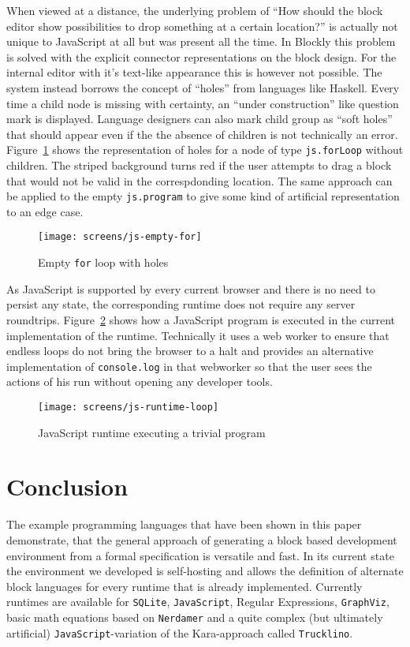 \documentclass[sigconf,natbib=false,review=true,anonymous]{acmart}
\begin{document}
When viewed at a distance, the underlying problem of \enquote{How should the block editor show possibilities to drop something at a certain location?} is actually not unique to JavaScript at all but was present all the time. In Blockly this problem is solved with the explicit connector representations on the block design. For the internal editor with it's text-like appearance this is however not possible. The system instead borrows the concept of \enquote{holes} from languages like Haskell. Every time a child node is missing with certainty, an \enquote{under construction} like question mark is displayed. Language designers can also mark child group as \enquote{soft holes} that should appear even if the the absence of children is not technically an error. Figure~\ref{fig:screen-js-empty-for} shows the representation of holes for a node of type \texttt{js.forLoop} without children. The striped background turns red if the user attempts to drag a block that would not be valid in the correspdonding location. The same approach can be applied to the empty \texttt{js.program} to give some kind of artificial representation to an edge case.

\begin{figure}
  \texttt{[image: screens/js-empty-for]}
  \caption{Empty \texttt{for} loop with holes}
  \label{fig:screen-js-empty-for}
\end{figure}

As JavaScript is supported by every current browser and there is no need to persist any state, the corresponding runtime does not require any server roundtrips. Figure~\ref{fig:screen-js-runtime-loop} shows how a JavaScript program is executed in the current implementation of the runtime. Technically it uses a web worker to ensure that endless loops do not bring the browser to a halt and provides an alternative implementation of \texttt{console.log} in that webworker so that the user sees the actions of his run without opening any developer tools.

\begin{figure}
  \texttt{[image: screens/js-runtime-loop]}
  \caption{JavaScript runtime executing a trivial program}
  \label{fig:screen-js-runtime-loop}
\end{figure}

\section{Conclusion}

The example programming languages that have been shown in this paper demonstrate, that the general approach of generating a block based development environment from a formal specification is versatile and fast. In its current state the environment we developed is self-hosting and allows the definition of alternate block languages for every runtime that is already implemented. Currently runtimes are available for \texttt{SQLite}, \texttt{JavaScript}, Regular Expressions, \texttt{GraphViz}, basic math equations based on \texttt{Nerdamer} and a quite complex (but ultimately artificial) \texttt{JavaScript}-variation of the Kara-approach called \texttt{Trucklino}\cite{popp_konzeption_2019}.

\printbibliography
\end{document}
